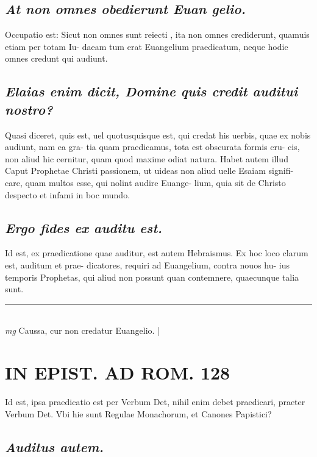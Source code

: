 \documentclass{article}
\begin{document}
\begin{pages}
\subsection*{\textit{At non omnes obedierunt Euan gelio. }}\pstart Occupatio est: Sicut non omnes sunt reiecti , ita non omnes crediderunt, quamuis etiam per totam Iu- daeam tum erat Euangelium praedicatum, neque hodie omnes credunt qui audiunt.  \pend
{}
{}
\subsection*{\textit{Elaias enim dicit, Domine quis credit auditui nostro? }}\pstart Quasi diceret, quis est, uel quotusquisque est, qui credat his uerbis, quae ex nobis audiunt, nam ea gra- tia quam praedicamus, tota est obscurata formis cru- cis, non aliud hic cernitur, quam quod maxime odiat natura. Habet autem illud Caput Prophetae Christi passionem, ut uideas non aliud uelle Esaiam signifi- care, quam multos esse, qui nolint audire Euange- lium, quia sit de Christo despecto et infami in boc mundo.   \pend
{}
{}
\subsection*{\textit{Ergo fides ex auditu est. }}\pstart Id est, ex praedicatione quae auditur, est autem Hebraismus. Ex hoc loco clarum est, auditum et prae- dicatores, requiri ad Euangelium, contra nouos hu- ius temporis Prophetas, qui aliud non possunt quan contemnere, quaecunque talia sunt.   \pend
\vspace{0.5cm}\noindent
\vspace{0.2cm}\rule{1cm}{0.2pt}\\ 
\hspace{0.2cm}\textit{mg}
\footnotesize Caussa, cur non credatur Euangelio.  
\normalsize| 
\section*{IN EPIST. AD ROM.  128 }\pstart Id est, ipsa praedicatio est per Verbum Det, nihil enim debet praedicari, praeter Verbum Det. Vbi hie sunt Regulae Monachorum, et Canones Papistici?  \pend
{}
{}
\subsection*{\textit{Auditus autem. }}
{}

\end{pages}
\end{document}

